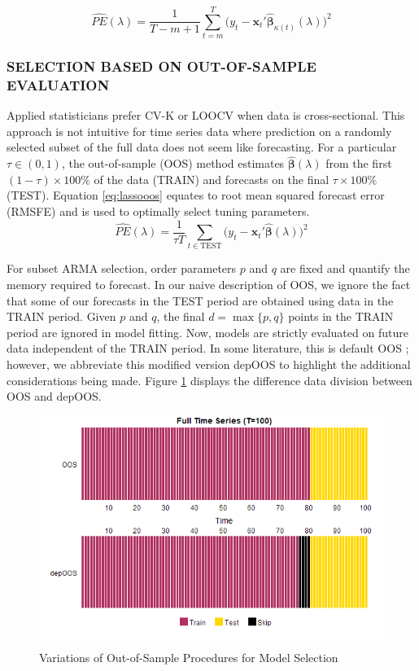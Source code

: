 \begin{equation}
\label{eq:lassocvpe}
	\widehat{PE}(\lambda)=\frac{1}{T-m+1}\sum\limits_{t=m}^T \bigg(y_t-\bm{x}_t'\hat{\bm{\beta}}_{\kappa(t)}(\lambda)\bigg)^2
\end{equation}


\subsubsection{SELECTION BASED ON OUT-OF-SAMPLE EVALUATION}

Applied statisticians prefer CV-K or LOOCV when data is cross-sectional. This approach is not intuitive for time series data where prediction on a randomly selected subset of the full data does not seem like forecasting. For a particular $\tau\in (0,1)$, the out-of-sample (OOS) method estimates $\hat{\bm{\beta}}(\lambda)$ from the first $(1-\tau)\times 100\%$ of the data (TRAIN) and forecasts on the final $\tau\times 100\%$ (TEST). Equation 
\ref{eq:lassooos} equates to root mean squared forecast error (RMSFE) and is used to optimally select tuning parameters. 
\begin{equation}
\label{eq:lassooos}
	\widehat{PE}(\lambda)=\frac{1}{\tau T}\sum\limits_{t\in \textrm{TEST}} \bigg(y_t-\bm{x}_t'\hat{\bm{\beta}}(\lambda)\bigg)^2
\end{equation}

For subset ARMA selection, order parameters $p$ and $q$ are fixed and quantify the memory required to forecast.  In our naive description of OOS, we ignore the fact that some of our forecasts in the TEST period are obtained using data in the TRAIN period. Given $p$ and $q$, the final $d=\max\{p,q\}$ points in the TRAIN period are ignored in model fitting. Now, models are strictly evaluated on future data independent of the TRAIN period. In some literature, this is default OOS \citep{Bergmeir2018}; however, we abbreviate this modified version depOOS to highlight the additional considerations being made. Figure \ref{fig:oosplots} displays the difference data division between OOS and depOOS.

\begin{figure}[htbp!]
	\caption{Variations of Out-of-Sample Procedures for Model Selection}
	\label{fig:oosplots}
	\includegraphics[scale=0.7]{oosplots}
\end{figure}


